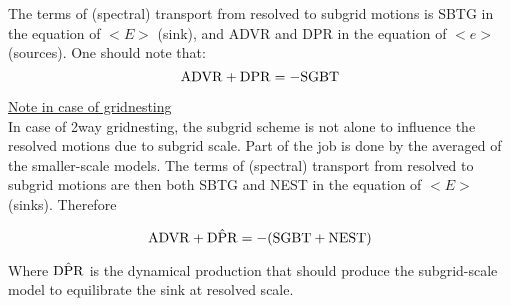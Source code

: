 The terms of (spectral) transport from resolved to subgrid motions is
SBTG in the equation of $<E>$ (sink), and
ADVR and DPR in the equation of $<e>$ (sources).
One should note that: \\

\begin{displaymath}
{\rm ADVR}+{\rm DPR} = -{\rm SGBT}
\end{displaymath}

\underline{Note in case of gridnesting}\\

In case of 2way gridnesting, the subgrid scheme is not alone to influence
the resolved motions due to subgrid scale. Part of the job is done
by the averaged of the smaller-scale models. 
The terms of (spectral) transport from resolved to subgrid motions are
then both SBTG and NEST in the equation of $<E>$ (sinks).
Therefore

\begin{displaymath}
{\rm ADVR}+\hat{\rm DPR} = -({\rm SGBT+NEST})
\end{displaymath}

Where $\hat{\rm DPR}$ is the dynamical production that should produce
the subgrid-scale model to equilibrate the sink at resolved scale.\\



